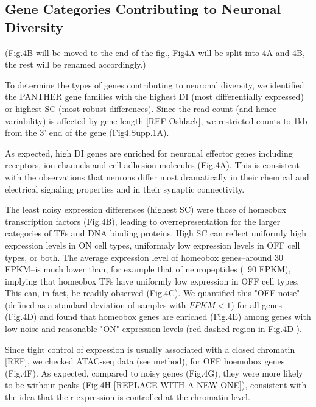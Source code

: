 \subsection{Gene Categories Contributing to Neuronal Diversity}

(Fig.4B will be moved to the end of the fig., Fig4A will be split into 4A and 4B, the rest will be renamed accordingly.)

To determine the types of genes contributing to neuronal diversity, we identified the PANTHER gene families with the highest DI (most differentially expressed) or highest SC (most robust differences). Since the read count (and hence variability) is affected by gene length [REF Oshlack], we restricted counts to 1kb from the 3' end of the gene (Fig4.Supp.1A). 

As expected, high DI genes are enriched for neuronal effector genes including receptors, ion channels and cell adhesion molecules (Fig.4A). This is consistent with the observations that neurons differ most dramatically in their chemical and electrical signaling properties and in their synaptic connectivity.

The least noisy expression differences (highest SC) were those of homeobox transcription factors (Fig.4B), leading to overrepresentation for the larger categories of TFs and DNA binding proteins. High SC can reflect uniformly high expression levels in ON cell types, uniformaly low expression levels in OFF cell types, or both. The average expression level of homeobox genes--around 30 FPKM--is much lower than, for example that of  neuropeptides (~90 FPKM), implying that homeobox TFs have uniformly low expression in OFF cell types. This can, in fact, be readily observed (Fig.4C). We quantified this "OFF noise" (defined as a standard deviation of samples with $FPKM<1$) for all genes (Fig.4D) and found that homeobox genes are enriched (Fig.4E) among genes with low noise and reasonable "ON" expression levels (red dashed region in Fig.4D ).

Since tight control of expression is usually associated with a closed chromatin [REF], we checked ATAC-seq data (see method), for OFF hoemobox genes (Fig.4F). As expected, compared to noisy genes (Fig.4G), they were more likely to be without peaks (Fig.4H [REPLACE WITH A NEW ONE]), consistent with the idea that their expression is controlled at the chromatin level.

